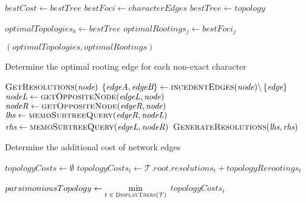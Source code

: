 \documentclass[12pt]{article}
\begin{document}
{\begin{algorithm}
\begin{algorithmic}[1]
              \EndFor
                  \State $bestCost \gets bestTree$
                  \State $bestFoci \gets characterEdges$
                  \State $bestTree \gets topology$
				\EndIf

			\EndFor
			\State $optimalTopologies_b \gets bestTree$
			    \State $optimalRootings_j \gets bestFoci_j$
			  \EndIf
			\EndFor

		\EndFor		
		
		\State \Return $(optimalTopologies, optimalRootings)$

		\EndFunction
	\end{algorithmic}
\end{algorithm}


\begin{algorithm}
	\caption{Determine the optimal rooting edge for each non-exact character}
	\label{Alg:generate-resolutions}
	\begin{algorithmic}[1]
		  \State \Return $\Call{GetResolutions}{\textit{node}}$
		\EndIf
		\State $\left\{ \textit{edgeA}, \textit{edgeB} \right\} \gets \Call{incedentEdges}{\textit{node}} \backslash \left\{ \textit{edge} \right\}$
		\State $\textit{nodeL} \gets \Call{getOppositeNode}{ \textit{edgeL}, \textit{node} }$
		\State $\textit{nodeR} \gets \Call{getOppositeNode}{ \textit{edgeR}, \textit{node} }$
		\State $\textit{lhs} \gets \Call{memoSubtreeQuery}{\textit{edgeR},\textit{nodeL}}$
		\State $\textit{rhs} \gets \Call{memoSubtreeQuery}{\textit{edgeL},\textit{nodeR}}$
		\State \Return $\Call{GenerateResolutions}{\textit{lhs}, \textit{rhs}}$
		\EndFunction
	\end{algorithmic}
\end{algorithm}


\begin{algorithm}
	\caption{Determine the additional cost of network edges}
	\label{Alg:network-edge-cost}
	\begin{algorithmic}[1]
		
		\State $topologyCosts \gets \emptyset$
		  \State $topologyCosts_{t} \gets \mathcal{T}.root.resolutions_{t} + topologyRerootings_t$
		\EndFor
		
		\State $parsimoniousTopology \gets \min\limits_{t\; \in\; \Call{DisplayTrees}{\mathcal{T}}}$ $topologyCosts_{t}$
		

\end{algorithmic}
\end{algorithm}}
\end{document}
